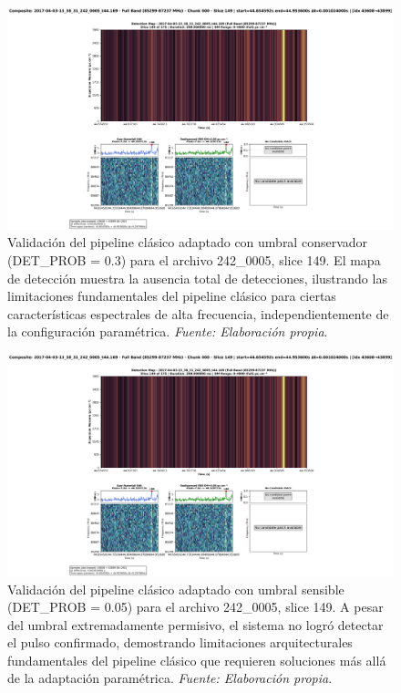 \begin{figure}[H]
    \centering
    \includegraphics[width=\textwidth]{figures/2017-04-03-13_38_31_242_0005_t44.169_slice149.png}
    \caption[Pipeline clásico: Umbral conservador (242\_0005)]{Validación del pipeline clásico adaptado con umbral conservador (DET\_PROB = 0.3) para el archivo 242\_0005, slice 149. El mapa de detección muestra la ausencia total de detecciones, ilustrando las limitaciones fundamentales del pipeline clásico para ciertas características espectrales de alta frecuencia, independientemente de la configuración paramétrica. \textit{Fuente: Elaboración propia}.}
    \label{fig:242_0005_slice149_highProb}
\end{figure}

\begin{figure}[H]
    \centering
    \includegraphics[width=\textwidth]{figures/2017-04-03-13_38_31_242_0005_t44.169_slice149-lowProb.png}
    \caption[Pipeline clásico: Umbral sensible (242\_0005)]{Validación del pipeline clásico adaptado con umbral sensible (DET\_PROB = 0.05) para el archivo 242\_0005, slice 149. A pesar del umbral extremadamente permisivo, el sistema no logró detectar el pulso confirmado, demostrando limitaciones arquitecturales fundamentales del pipeline clásico que requieren soluciones más allá de la adaptación paramétrica. \textit{Fuente: Elaboración propia}.}
    \label{fig:242_0005_slice149_lowProb}
\end{figure}

